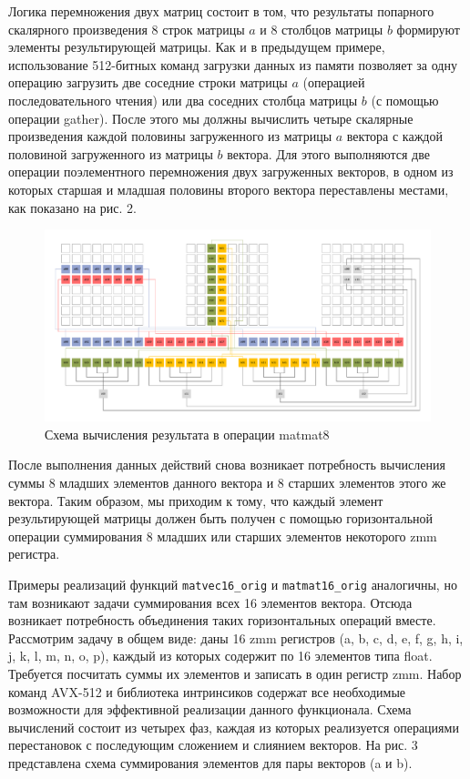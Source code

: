 Логика перемножения двух матриц состоит в том, что результаты попарного скалярного произведения 8 строк матрицы $a$ и 8 столбцов матрицы $b$ формируют элементы результирующей матрицы.
Как и в предыдущем примере, использование 512-битных команд загрузки данных из памяти позволяет за одну операцию загрузить две соседние строки матрицы $a$ (операцией последовательного чтения) или два соседних столбца матрицы $b$ (с помощью операции gather).
После этого мы должны вычислить четыре скалярные произведения каждой половины загруженного из матрицы $a$ вектора с каждой половиной загруженного из матрицы $b$ вектора.
Для этого выполняются две операции поэлементного перемножения двух загруженных векторов, в одном из которых старшая и младшая половины второго вектора переставлены местами, как показано на рис. 2.

\begin{figure}[ht]
	\centering
		\includegraphics[width=1.00\textwidth]{./pics/text_4_small_matr/matmat8.pdf}
	\caption{Схема вычисления результата в операции matmat8}
	\label{fig:text_4_small_matr_matmat8}
\end{figure}

После выполнения данных действий снова возникает потребность вычисления суммы 8 младших элементов данного вектора и 8 старших элементов этого же вектора.
Таким образом, мы приходим к тому, что каждый элемент результирующей матрицы должен быть получен с помощью горизонтальной операции суммирования 8 младших или старших элементов некоторого zmm регистра.

Примеры реализаций функций \texttt{matvec16\_orig} и \texttt{matmat16\_orig} аналогичны, но там возникают задачи суммирования всех 16 элементов вектора.
Отсюда возникает потребность объединения таких горизонтальных операций вместе.
Рассмотрим задачу в общем виде: даны 16 zmm регистров (a, b, c, d, e, f, g, h, i, j, k, l, m, n, o, p), каждый из которых содержит по 16 элементов типа float.
Требуется посчитать суммы их элементов и записать в один регистр zmm.
Набор команд AVX-512 и библиотека интринсиков содержат все необходимые возможности для эффективной реализации данного функционала.
Схема вычислений состоит из четырех фаз, каждая из которых реализуется операциями перестановок с последующим сложением и слиянием векторов.
На рис. 3 представлена схема суммирования элементов для пары векторов (a и b).

